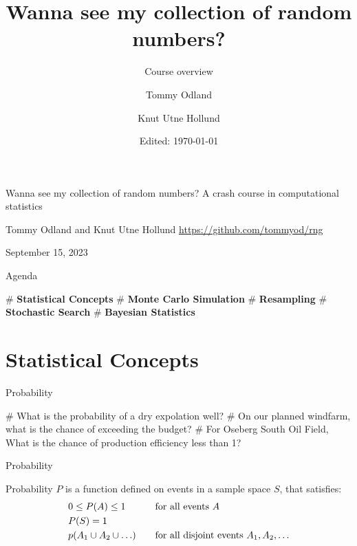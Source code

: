\documentclass[12pt, aspectratio=149]{beamer}
\institute{Equinor}
\date{Edited: \today}
\author{Tommy Odland \and Knut Utne Hollund}
\title{Wanna see my collection of random numbers?}
\subtitle{Course overview}
\theoremstyle{plain}
\begin{document}
\begin{frame}{}
	\begin{center}
			\vfill
	{\huge Wanna see my collection of random numbers?}
	\vfill
	{\large A crash course in computational statistics}
	\vfill
	

	\vfill
	{\large  Tommy Odland and Knut Utne Hollund}
	\vfill
	{\small \href{https://github.com/tommyod/rng}{https://github.com/tommyod/rng}}

	\vfill
	September 15, 2023
	\vfill
	\end{center}
\end{frame}

\begin{frame}[fragile]{Agenda}
	\begin{center}
	\end{center}
	
	\begin{easylist}[itemize]
		# \textbf{Statistical Concepts} 
		# \textbf{Monte Carlo Simulation}
		# \textbf{Resampling}
		# \textbf{Stochastic Search} 
		# \textbf{Bayesian Statistics} 
	\end{easylist}
\end{frame}


\section{Statistical Concepts}

\begin{frame}[fragile]{Probability}
	
	\begin{easylist}[itemize]
		# What is the probability of a dry expolation well?
		# On our planned windfarm, what is the chance of exceeding the budget?
		# For Oseberg South Oil Field, What is the chance of production efficiency less than 1?
	\end{easylist}
\end{frame}

\begin{frame}[fragile]{Probability}

	Probability $P$ is a function defined on events in a sample space $S$, that satisfies:
	\begin{align*}
		& 0 \leq P(A) \leq 1  & & \text{for all events $A$} \\
		& P(S) = 1 & & \\
		& p(A_{1} \cup A_{2} \cup \ldots) & \hspace*{1em} & \text{for all disjoint events $A_{1}, A_{2}, \ldots$}	
	\end{align*}  
	
\end{frame}
\end{document}
